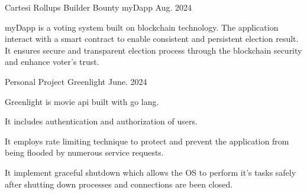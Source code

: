 
\begin{cventries}

  \cventry
  {Cartesi Rollups Builder Bounty} %
  {myDapp } %
  {} %
  {Aug. 2024} %
  {
    \begin{cvitems} %
      \item {myDapp is a voting system built on blockchain technology. The
                  application interact with a smart contract to enable
                  consistent and persistent
                  election result. It ensures secure and transparent election
                  process through the
                  blockchain security and enhance voter's trust.}
    \end{cvitems}
  }
  \cventry
  {Personal Project} %
  {Greenlight } %
  {} %
  {June. 2024} %
  {
    \begin{cvitems} %
      \item {Greenlight is movie api built with go lang.}
      \item {It includes authentication and authorization of users.}
      \item {It employs rate limiting technique to protect and prevent the
                  application from being flooded by numerous service requests.}
      \item {It implement graceful shutdown which allows the OS to perform it's
                  tasks safely after shutting down processes and connections
                  are been closed.}
    \end{cvitems}
  }


\end{cventries}
